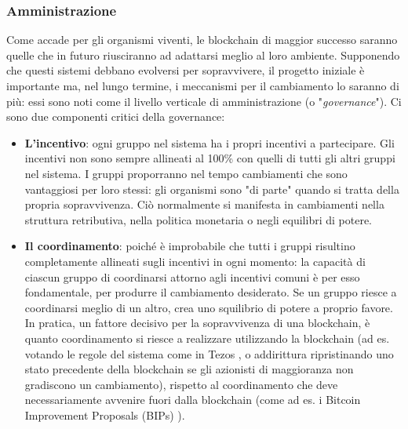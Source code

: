 \subsubsection{Amministrazione}
Come accade per gli organismi viventi, le blockchain di maggior successo saranno quelle che in futuro riusciranno ad adattarsi meglio al loro ambiente. Supponendo che questi sistemi debbano evolversi per sopravvivere, il progetto iniziale è importante ma, nel lungo termine, i meccanismi per il cambiamento lo saranno di più: essi sono noti come il livello verticale di amministrazione (o "\emph{governance}"). Ci sono due componenti critici della governance:
\begin{itemize}
	\item
	      \textbf{L'incentivo}: ogni gruppo nel sistema ha i propri incentivi a partecipare. Gli incentivi non sono sempre allineati al 100\% con quelli di tutti gli altri gruppi nel sistema. I gruppi proporranno nel tempo cambiamenti che sono vantaggiosi per loro stessi: gli organismi sono "di parte" quando si tratta della propria sopravvivenza. Ciò normalmente si manifesta in cambiamenti nella struttura retributiva, nella politica monetaria o negli equilibri di potere.

	\item
	      \textbf{Il coordinamento}: poiché è improbabile che tutti i gruppi risultino completamente allineati sugli incentivi in ogni momento: la capacità di ciascun gruppo di coordinarsi attorno agli incentivi comuni è per esso fondamentale, per produrre il cambiamento desiderato. Se un gruppo riesce a coordinarsi meglio di un altro, crea uno squilibrio di potere a proprio favore. In pratica, un fattore decisivo per la sopravvivenza di una blockchain, è quanto coordinamento si riesce a realizzare utilizzando la blockchain (ad es. votando le regole del sistema come in Tezos \cite{c34}, o addirittura ripristinando uno stato precedente della blockchain se gli azionisti di maggioranza non gradiscono un cambiamento), rispetto al coordinamento che deve necessariamente avvenire fuori dalla blockchain (come ad es. i Bitcoin Improvement Proposals (BIPs)
	      \cite{c3}).

\end{itemize}

